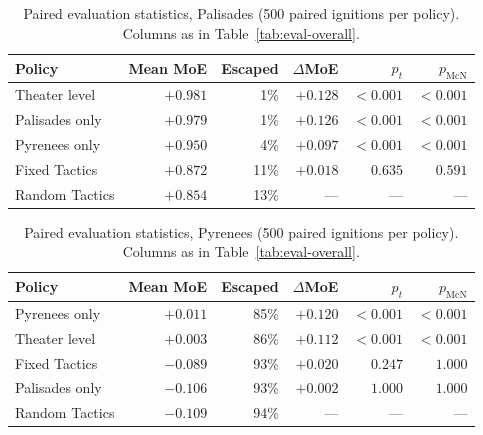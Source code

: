 \begin{table}[t]
  \centering
  \caption{Paired evaluation statistics, Palisades (500 paired ignitions per
    policy). Columns as in Table~\ref{tab:eval-overall}.}
  \label{tab:eval-palisades}
  \begin{tabular}{lrrrrr}
    \toprule
    Policy & Mean MoE & Escaped & $\Delta$MoE & $p_t$ & $p_{\mathrm{McN}}$ \\
    \midrule
    Theater level & $+0.981$ & 1\% & $+0.128$ & $<\!0.001$ & $<\!0.001$ \\
    Palisades only & $+0.979$ & 1\% & $+0.126$ & $<\!0.001$ & $<\!0.001$ \\
    Pyrenees only & $+0.950$ & 4\% & $+0.097$ & $<\!0.001$ & $<\!0.001$ \\
    Fixed Tactics & $+0.872$ & 11\% & $+0.018$ & $0.635$ & $0.591$ \\
    Random Tactics & $+0.854$ & 13\% & --- & --- & --- \\
    \bottomrule
  \end{tabular}
\end{table}

\begin{table}[t]
  \centering
  \caption{Paired evaluation statistics, Pyrenees (500 paired ignitions per
    policy). Columns as in Table~\ref{tab:eval-overall}.}
  \label{tab:eval-pyrenees}
  \begin{tabular}{lrrrrr}
    \toprule
    Policy & Mean MoE & Escaped & $\Delta$MoE & $p_t$ & $p_{\mathrm{McN}}$ \\
    \midrule
    Pyrenees only & $+0.011$ & 85\% & $+0.120$ & $<\!0.001$ & $<\!0.001$ \\
    Theater level & $+0.003$ & 86\% & $+0.112$ & $<\!0.001$ & $<\!0.001$ \\
    Fixed Tactics & $-0.089$ & 93\% & $+0.020$ & $0.247$ & $1.000$ \\
    Palisades only & $-0.106$ & 93\% & $+0.002$ & $1.000$ & $1.000$ \\
    Random Tactics & $-0.109$ & 94\% & --- & --- & --- \\
    \bottomrule
  \end{tabular}
\end{table}

